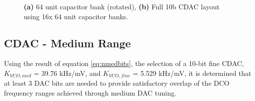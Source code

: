 \begin{figure}[htb!]
\begin{subfigure}{0.5\textwidth}
	        \caption{ }
	        \label{fig:lay_cdac_unit}
	    \end{subfigure}
	    \caption{\textbf{(a)} 64 unit capacitor bank (rotated), \textbf{(b)} Full 10b CDAC layout using 16x 64 unit capacitor banks.}
	    \label{fig:10bcdac_lay}
	\end{figure} 


	\FloatBarrier
	\subsection{CDAC - Medium Range}
	Using the result of equation \ref{eq:nmedbits}, the selection of a 10-bit fine CDAC, $K_{VCO,med}$ = 39.76 kHz/mV, and $K_{VCO,fine}$ = 5.529 kHz/mV, it is determined that at least 3 DAC bits are needed to provide satisfactory overlap of the DCO frequency ranges achieved through medium DAC tuning.
